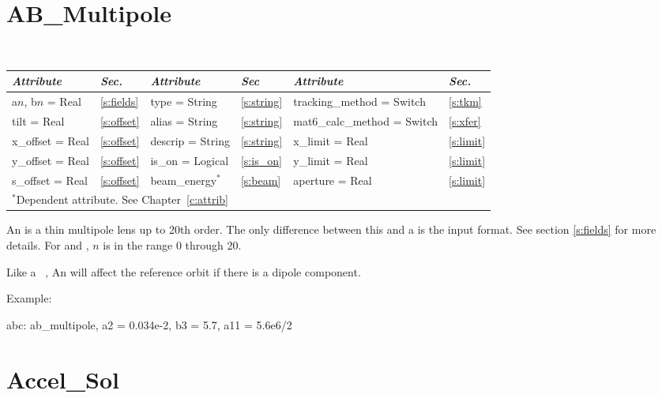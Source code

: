 \vfil
\break

\section{AB\_Multipole}
\label{s:ab_m}

\begin{center}
\tt 
\begin{tabular}{|l|l||l|l||l|l|} \hline
  {\sl Attribute} & {\sl Sec.}  & {\sl Attribute} & {\sl Sec} & {\sl Attribute} & {\sl Sec.} \\ \hline
  a$n$, b$n$ = Real  &  \ref{s:fields} &  type = String    & \ref{s:string} & tracking\_method = Switch    & \ref{s:tkm}   \\ \hline
  tilt       = Real  &  \ref{s:offset} &  alias = String   & \ref{s:string} & mat6\_calc\_method = Switch  & \ref{s:xfer}  \\ \hline
  x\_offset  = Real  &  \ref{s:offset} &  descrip = String & \ref{s:string} & x\_limit = Real              & \ref{s:limit} \\ \hline
  y\_offset  = Real  &  \ref{s:offset} &  is\_on = Logical & \ref{s:is_on}  & y\_limit = Real              & \ref{s:limit} \\ \hline
  s\_offset  = Real  &  \ref{s:offset} &  beam\_energy$^*$ & \ref{s:beam}   & aperture = Real              & \ref{s:limit} \\ \hline
  \multicolumn{6}{l}{\small $^*$Dependent attribute. See Chapter~\ref{c:attrib}} \\
\end{tabular}
\end{center}
\toffset

An  is a thin multipole lens up to 20th order. The only
difference between this and a  is the input format. See
section \ref{s:fields} for more details. For 
and , $n$ is in the range 0 through 20.

Like a \mad\ , An  will affect the
reference orbit if there is a dipole component. 

Example:
\begin{example}
  abc: ab_multipole, a2 = 0.034e-2, b3 = 5.7, a11 = 5.6e6/2
\end{example}

\section{Accel\_Sol}
\label{s:accel_sol}

